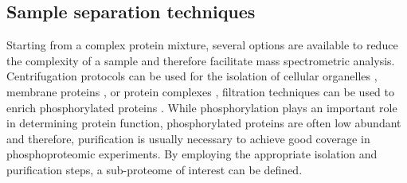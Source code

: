 \subsection{Sample separation techniques}

Starting from a complex protein mixture, several options are available to
reduce the complexity of a sample and therefore facilitate mass spectrometric 
analysis.
Centrifugation protocols can be used for the isolation of cellular organelles
\citep{Huber2003}, membrane proteins \citep{Gilmore2010}, or protein complexes 
\citep{Puig2001}, filtration techniques can be used to enrich phosphorylated 
proteins \citep{Thingholm2008}.
While phosphorylation plays an important role in determining protein function,
phosphorylated proteins are often low abundant and therefore, purification is
usually necessary to achieve good coverage in phosphoproteomic experiments.
By employing the appropriate isolation and purification steps, a sub-proteome
of interest can be defined.


